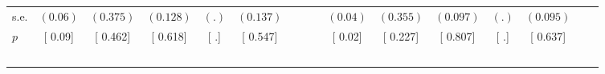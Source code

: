 \begin{longtable}{L{8em} c c c c c c c p{1em} c c c c c c c}
\quad \quad \quad \quad s.e.& $ (     0.06)$ & $ (    0.375)$ & $ (    0.128)$ & $ (        .)$ & $ (    0.137)$ & & & & $ (     0.04)$ & $ (    0.355)$ & $ (    0.097)$ & $ (        .)$ & $ (    0.095)$ & &  \\*
\quad \quad \quad \quad $ p$ & [     0.09] & [    0.462] & [    0.618] & [        .] & [    0.547] & & & & [     0.02] & [    0.227] & [    0.807] & [        .] & [    0.637] & &  \\[1em]
~\\[1em]
\end{longtable}